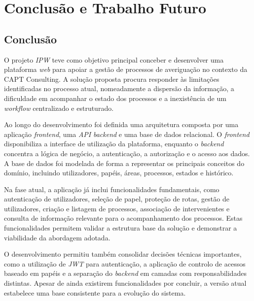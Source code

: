 \chapter{Conclus\~{a}o e Trabalho Futuro} \label{cap:conclusao}

\section{Conclus\~{a}o} \label{sec:conclusao}

O projeto \textit{IPW} teve como objetivo principal conceber e desenvolver uma plataforma \textit{web} para apoiar a gest\~{a}o de processos de averigua\c{c}\~{a}o no contexto da CAPT Consulting. A solu\c{c}\~{a}o proposta procura responder \`{a}s limita\c{c}\~{o}es identificadas no processo atual, nomeadamente a dispers\~{a}o da informa\c{c}\~{a}o, a dificuldade em acompanhar o estado dos processos e a inexist\^{e}ncia de um \textit{workflow} centralizado e estruturado.

Ao longo do desenvolvimento foi definida uma arquitetura composta por uma aplica\c{c}\~{a}o \textit{frontend}, uma \textit{API} \textit{backend} e uma base de dados relacional. O \textit{frontend} disponibiliza a interface de utiliza\c{c}\~{a}o da plataforma, enquanto o \textit{backend} concentra a l\'{o}gica de neg\'{o}cio, a autentica\c{c}\~{a}o, a autoriza\c{c}\~{a}o e o acesso aos dados. A base de dados foi modelada de forma a representar os principais conceitos do dom\'{i}nio, incluindo utilizadores, pap\'{e}is, \'{a}reas, processos, estados e hist\'{o}rico.

Na fase atual, a aplica\c{c}\~{a}o j\'{a} inclui funcionalidades fundamentais, como autentica\c{c}\~{a}o de utilizadores, sele\c{c}\~{a}o de papel, prote\c{c}\~{a}o de rotas, gest\~{a}o de utilizadores, cria\c{c}\~{a}o e listagem de processos, associa\c{c}\~{a}o de intervenientes e consulta de informa\c{c}\~{a}o relevante para o acompanhamento dos processos. Estas funcionalidades permitem validar a estrutura base da solu\c{c}\~{a}o e demonstrar a viabilidade da abordagem adotada.

O desenvolvimento permitiu tamb\'{e}m consolidar decis\~{o}es t\'{e}cnicas importantes, como a utiliza\c{c}\~{a}o de \textit{JWT} para autentica\c{c}\~{a}o, a aplica\c{c}\~{a}o de controlo de acessos baseado em pap\'{e}is e a separa\c{c}\~{a}o do \textit{backend} em camadas com responsabilidades distintas. Apesar de ainda existirem funcionalidades por concluir, a vers\~{a}o atual estabelece uma base consistente para a evolu\c{c}\~{a}o do sistema.

